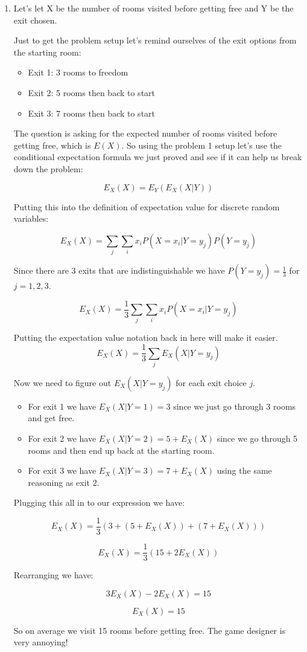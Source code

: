 \documentclass[10pt]{article}
\begin{document}
\begin{enumerate}[label=(\alph*)]
	\item Let's let X be the number of rooms visited before getting free and Y be the exit chosen.

	      Just to get the problem setup let's remind ourselves of the exit options from the starting room:

	      \begin{itemize}
		      \item Exit 1: 3 rooms to freedom
		      \item Exit 2: 5 rooms then back to start
		      \item Exit 3: 7 rooms then back to start
	      \end{itemize}

	      The question is asking for the expected number of rooms visited before getting free, which is $E(X)$. So using the problem 1 setup let's use the conditional expectation formula we just proved and see if it can help us break down the problem:

	      \[ E_{X}(X) = E_{Y}(E_{X}(X|Y)) \]

	      Putting this into the definition of expectation value for discrete random variables:

	      \[ E_{X}(X) = \sum_{j} \sum_{i} x_i P(X=x_i|Y=y_j) P(Y=y_j) \]

	      Since there are 3 exits that are indistinguishable we have $P(Y=y_j) = \frac{1}{3}$ for $j=1,2,3$.

	      \[ E_{X}(X) = \frac{1}{3} \sum_{j} \sum_{i} x_i P(X=x_i|Y=y_j) \]

	      Putting the expectation value notation back in here will make it easier.
	      \[ E_{X}(X) = \frac{1}{3} \sum_{j} E_{X}(X|Y=y_j) \]

	      Now we need to figure out $E_{X}(X|Y=y_j)$ for each exit choice $j$.

	      \begin{itemize}
		      \item For exit 1 we have $E_{X}(X|Y=1) = 3$ since we just go through 3 rooms and get free.
		      \item For exit 2 we have $E_{X}(X|Y=2) = 5 + E_{X}(X)$ since we go through 5 rooms and then end up back at the starting room.
		      \item For exit 3 we have $E_{X}(X|Y=3) = 7 + E_{X}(X)$ using the same reasoning as exit 2.
	      \end{itemize}

	      Plugging this all in to our expression we have:

	      \[ E_{X}(X) = \frac{1}{3} \left( 3 + (5 + E_{X}(X)) + (7 + E_{X}(X)) \right) \]

	      \[ E_{X}(X) = \frac{1}{3} \left( 15 + 2E_{X}(X) \right) \]

	      Rearranging we have:

	      \[ 3E_{X}(X) - 2E_{X}(X) = 15 \]

	      \[ \boxed{ E_{X}(X) = 15 } \]

	      So on average we visit 15 rooms before getting free. The game designer is very annoying!
\end{enumerate}
\end{document}
